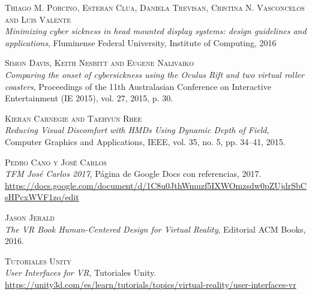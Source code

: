 \documentclass[12pt,a4paper]{article}
\begin{document}
\begin{thebibliography}{X}

\textsc{Thiago M. Porcino, Esteban Clua, Daniela Trevisan, Cristina N. Vasconcelos and Luis Valente}\\
\textit{Minimizing cyber sickness in head mounted display systems: design guidelines and applications}, Fluminense Federal University, Institute of Computing, 2016

\textsc{Simon Davis, Keith Nesbitt and Eugene Nalivaiko}\\
\textit{Comparing the onset of cybersickness using the Oculus Rift and two virtual roller coasters}, Proceedings of the 11th Australasian Conference on Interactive Entertainment (IE 2015), vol. 27, 2015, p. 30.

\textsc{Kieran Carnegie and Taehyun Rhee}\\
\textit{Reducing Visual Discomfort with HMDs Using Dynamic Depth of Field}, Computer Graphics and Applications, IEEE, vol. 35, no. 5, pp. 34–41, 2015.

\textsc{Pedro Cano y José Carlos}\\
\textit{TFM José Carlos 2017}, Página de Google Docs con referencias, 2017.\\
\url{https://docs.google.com/document/d/1C8u0JthWmuzf5IXWOmzsdw0pZUjdrSbCsHPcxWVF1zo/edit}

\textsc{Jason Jerald}\\
\textit{The VR Book Human-Centered Design for Virtual Reality}, Editorial ACM Books, 2016.

\textsc{Tutoriales Unity}\\
\textit{User Interfaces for VR}, Tutoriales Unity.\\
\url{https://unity3d.com/es/learn/tutorials/topics/virtual-reality/user-interfaces-vr}

\end{thebibliography}
\end{document}
